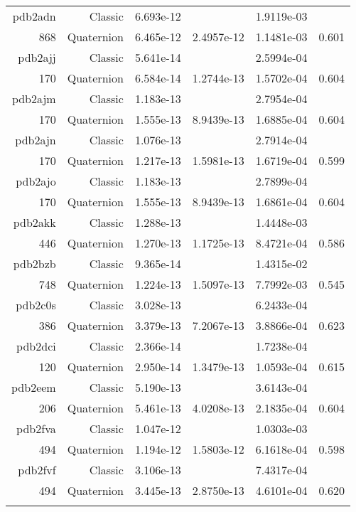\begin{xltabular}{\textwidth}{r|rS[table-format=1.3e+2]S[table-format=1.4e+2]S[table-format=1.4e+2]S[table-format=-1.3]}
pdb2adn & Classic & 6.693e-12 &  & 1.9119e-03 & \\
868 & Quaternion & 6.465e-12 & 2.4957e-12 & 1.1481e-03 & 0.601\\  \addlinespace
pdb2ajj & Classic & 5.641e-14 &  & 2.5994e-04 & \\
170 & Quaternion & 6.584e-14 & 1.2744e-13 & 1.5702e-04 & 0.604\\  \addlinespace
pdb2ajm & Classic & 1.183e-13 &  & 2.7954e-04 & \\
170 & Quaternion & 1.555e-13 & 8.9439e-13 & 1.6885e-04 & 0.604\\  \addlinespace
pdb2ajn & Classic & 1.076e-13 &  & 2.7914e-04 & \\
170 & Quaternion & 1.217e-13 & 1.5981e-13 & 1.6719e-04 & 0.599\\  \addlinespace
pdb2ajo & Classic & 1.183e-13 &  & 2.7899e-04 & \\
170 & Quaternion & 1.555e-13 & 8.9439e-13 & 1.6861e-04 & 0.604\\  \addlinespace
pdb2akk & Classic & 1.288e-13 &  & 1.4448e-03 & \\
446 & Quaternion & 1.270e-13 & 1.1725e-13 & 8.4721e-04 & 0.586\\  \addlinespace
{\color{red} pdb2bzb } & Classic & 9.365e-14 &  & 1.4315e-02 & \\
748 & Quaternion & 1.224e-13 & 1.5097e-13 & 7.7992e-03 & 0.545\\  \addlinespace
pdb2c0s & Classic & 3.028e-13 &  & 6.2433e-04 & \\
386 & Quaternion & 3.379e-13 & 7.2067e-13 & 3.8866e-04 & 0.623\\  \addlinespace
pdb2dci & Classic & 2.366e-14 &  & 1.7238e-04 & \\
120 & Quaternion & 2.950e-14 & 1.3479e-13 & 1.0593e-04 & 0.615\\  \addlinespace
pdb2eem & Classic & 5.190e-13 &  & 3.6143e-04 & \\
206 & Quaternion & 5.461e-13 & 4.0208e-13 & 2.1835e-04 & 0.604\\  \addlinespace
pdb2fva & Classic & 1.047e-12 &  & 1.0303e-03 & \\
494 & Quaternion & 1.194e-12 & 1.5803e-12 & 6.1618e-04 & 0.598\\  \addlinespace
pdb2fvf & Classic & 3.106e-13 &  & 7.4317e-04 & \\
494 & Quaternion & 3.445e-13 & 2.8750e-13 & 4.6101e-04 & 0.620\\  \addlinespace

\end{xltabular}
